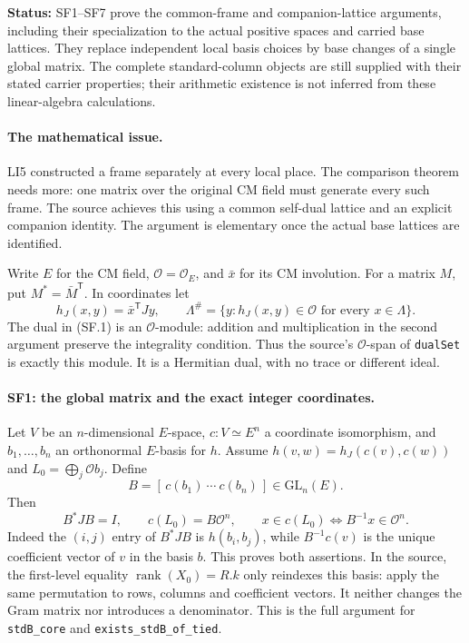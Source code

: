\documentclass[11pt,a4paper]{article}
\numberwithin{equation}{section}
\theoremstyle{remark}\newtheorem{remark}[theorem]{Remark}
\newcommand{\status}[1]{\textbf{Status:} #1}
\begin{document}
\status{SF1--SF7 prove the common-frame and companion-lattice arguments,
including their specialization to the actual positive spaces and carried
base lattices. They replace independent local basis choices by base changes
of a single global matrix. The complete standard-column objects are still
supplied with their stated carrier properties; their arithmetic existence
is not inferred from these linear-algebra calculations.}

\paragraph{The mathematical issue.}
LI5 constructed a frame separately at every local place. The comparison
theorem needs more: one matrix over the original CM field must generate
every such frame. The source achieves this using a common self-dual lattice
and an explicit companion identity. The argument is elementary once the
actual base lattices are identified.

Write $E$ for the CM field, $\mathcal O=\mathcal O_E$, and
$\bar x$ for its CM involution. For a matrix $M$, put
$M^*=\bar M^{\mathsf T}$. In coordinates let
\[
 h_J(x,y)=\bar x^{\mathsf T}Jy,\qquad
 \Lambda^\#=\{y:h_J(x,y)\in\mathcal O\text{ for every }x\in\Lambda\}.
                                                               \tag{SF.1}
\]
The dual in (SF.1) is an $\mathcal O$-module: addition and multiplication
in the second argument preserve the integrality condition. Thus the
source's $\mathcal O$-span of \texttt{dualSet} is exactly this module.
It is a Hermitian dual, with no trace or different ideal.

\paragraph{SF1: the global matrix and the exact integer coordinates.}
Let $V$ be an $n$-dimensional $E$-space, $c:V\simeq E^n$ a coordinate
isomorphism, and $b_1,\ldots,b_n$ an orthonormal $E$-basis for $h$.
Assume $h(v,w)=h_J(c(v),c(w))$ and
$L_0=\bigoplus_j\mathcal O b_j$. Define
\[
 B=[\,c(b_1)\ \cdots\ c(b_n)\,]\in\mathrm{GL}_n(E).
\]
Then
\[
 \boxed{\ B^*JB=I,\qquad c(L_0)=B\mathcal O^n,\qquad
 x\in c(L_0)\Longleftrightarrow B^{-1}x\in\mathcal O^n.\ }       \tag{SF.2}
\]
Indeed the $(i,j)$ entry of $B^*JB$ is $h(b_i,b_j)$, while
$B^{-1}c(v)$ is the unique coefficient vector of $v$ in the basis $b$.
This proves both assertions. In the source, the first-level equality
$\operatorname{rank}(X_0)=R.k$ only reindexes this basis: apply the same
permutation to rows, columns and coefficient vectors. It neither changes
the Gram matrix nor introduces a denominator. This is the full argument
for \texttt{stdB\_core} and \texttt{exists\_stdB\_of\_tied}.
\end{document}
